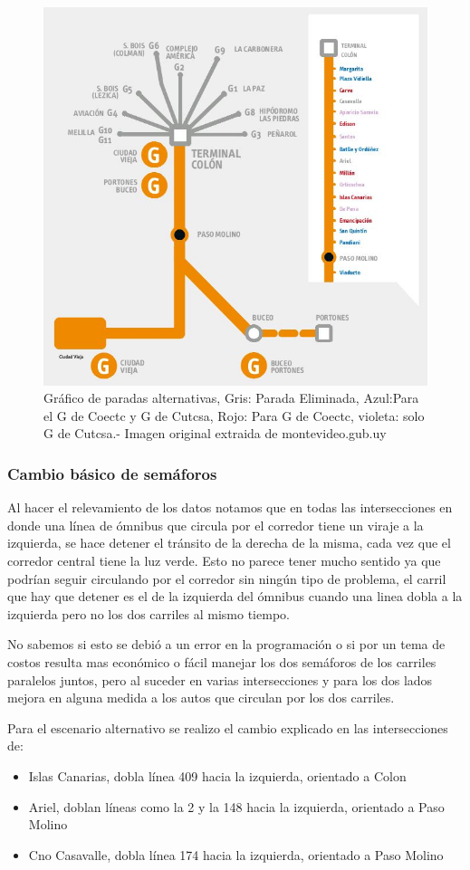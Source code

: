 \begin{figure}[h]
	\centering
	\includegraphics[width=0.7\linewidth]{Figures/paradas_alternativas}
	\caption{Gráfico de paradas alternativas, Gris: Parada Eliminada, Azul:Para el G de Coectc y G de Cutcsa, Rojo: Para G de Coectc, violeta: solo G de Cutcsa.- Imagen original extraida de montevideo.gub.uy}
	\label{fig:paradas_alternadas}
\end{figure}

\subsubsection{Cambio básico de semáforos}
Al hacer el relevamiento de los datos notamos que en todas las intersecciones en donde una línea de ómnibus que circula por el corredor tiene un viraje a la izquierda, se hace detener el tránsito de la derecha de la misma, cada vez que el corredor central tiene la luz verde. Esto no parece tener mucho sentido ya que podrían seguir circulando por el corredor sin ningún tipo de problema, el carril que hay que detener es el de la izquierda del ómnibus cuando una linea dobla a la izquierda pero no los dos carriles al mismo tiempo.

No sabemos si esto se debió a un error en la programación o si por un tema de costos resulta mas económico o fácil manejar los dos semáforos de los carriles paralelos juntos, pero al suceder en varias intersecciones y para los dos lados mejora en alguna medida a los autos que circulan por los dos carriles.

Para el escenario alternativo se realizo el cambio explicado en las intersecciones de:
\begin{itemize}
	\item Islas Canarias, dobla línea 409 hacia la izquierda, orientado a Colon
	\item Ariel, doblan líneas como la  2 y la 148 hacia la izquierda, orientado a Paso Molino 
	\item Cno Casavalle, dobla línea 174 hacia la izquierda, orientado a Paso Molino 
\end{itemize}

